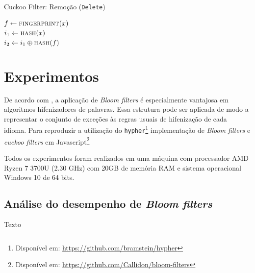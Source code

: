 \documentclass[12pt,twoside,english,brazilian]{book}
\begin{document}
\begin{algorithm}
    \caption{Cuckoo Filter: Remoção (\texttt{Delete})}\label{alg:cf-rem}

    $f \leftarrow \Call{fingerprint}{x}$ \\
    $i_1 \leftarrow \Call{hash}{x}$ \\
    $i_2 \leftarrow i_1 \oplus \Call{hash}{f}$ \\
\end{algorithm}

\clearpage

\chapter{Experimentos}

De acordo com \citet{bloom}, a aplicação de \textit{Bloom filters} é especialmente vantajosa em algoritmos hifenizadores de palavras. Essa estrutura pode ser aplicada de modo a representar o conjunto de exceções às regras usuais de hifenização de cada idioma. Para reproduzir a utilização do \texttt{hypher}\footnote{Disponível em: \url{https://github.com/bramstein/hypher}} implementação de \textit{Bloom filters} e \textit{cuckoo filters} em Javascript\footnote{Disponível em: \url{https://github.com/Callidon/bloom-filters}}

Todos os experimentos foram realizados em uma máquina com processador AMD Ryzen 7 3700U (2.30 GHz) com 20GB de memória RAM e sistema operacional Windows 10 de 64 bits.

\section{Análise do desempenho de \textit{Bloom filters}}

Texto
\end{document}
